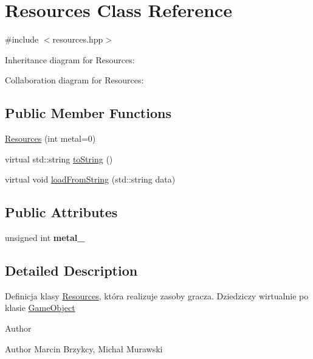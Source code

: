 \hypertarget{classResources}{}\section{Resources Class Reference}
\label{classResources}


{\ttfamily \#include $<$resources.\+hpp$>$}



Inheritance diagram for Resources\+:


Collaboration diagram for Resources\+:
\subsection*{Public Member Functions}
\begin{DoxyCompactItemize}
\item 
\hyperlink{classResources_a88c450c874f16921b3db4e5f18bcb0f8}{Resources} (int metal=0)
\item 
virtual std\+::string \hyperlink{classResources_a7101f9a268e171c2ddd0a1823f49a216}{to\+String} ()
\item 
virtual void \hyperlink{classResources_af52fa90c94244aabef9dd7c0b03c817e}{load\+From\+String} (std\+::string data)
\end{DoxyCompactItemize}
\subsection*{Public Attributes}
\begin{DoxyCompactItemize}
\item 
unsigned int {\bfseries metal\+\_\+}\hypertarget{classResources_a0a353af07f4492deca9570e3c80bd7aa}{}\label{classResources_a0a353af07f4492deca9570e3c80bd7aa}

\end{DoxyCompactItemize}


\subsection{Detailed Description}
Definicja klasy \hyperlink{classResources}{Resources}, która realizuje zasoby gracza. Dziedziczy wirtualnie po klasie \hyperlink{classGameObject}{Game\+Object} \begin{DoxyAuthor}{Author}

\end{DoxyAuthor}
\begin{DoxyParagraph}{Author}
Marcin Brzykcy, Michał Murawski 
\end{DoxyParagraph}


